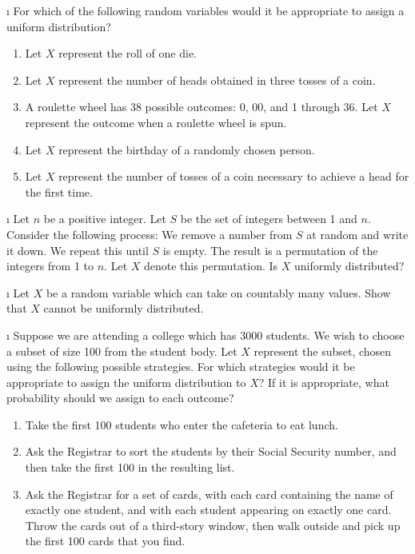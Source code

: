 \begin{LJSItem}

\i\label{exer 5.1.100} For which of the following random variables would it be
appropriate to assign a uniform distribution?
\begin{enumerate}
\item Let $X$ represent the roll of one die.
\item Let $X$ represent the number of heads obtained in three tosses of a coin.
\item A roulette wheel has 38 possible outcomes: 0, 00, and 1 through 36.  Let $X$
represent the outcome when a roulette wheel is spun.
\item Let $X$ represent the birthday of a randomly chosen person.
\item Let $X$ represent the number of tosses of a coin necessary to achieve a head for
the first time. 
\end{enumerate}

\i\label{exer 5.1.101} Let $n$ be a positive integer.  Let $S$ be the set of
integers between 1 and
$n$. Consider the following process:   We remove a number from $S$ at random and write it down. 
We repeat this until $S$ is empty.  The result is a permutation of the integers from 1
to $n$.  Let $X$ denote this permutation.  Is $X$ uniformly distributed?

\i\label{exer 5.1.102} Let $X$ be a random variable which can take on countably
many values.  Show that
$X$ cannot be uniformly distributed.

\i\label{exer 5.1.103} Suppose we are attending a college which has 3000 students. 
We wish to choose a subset of size 100 from the student body.  Let $X$ represent the
subset, chosen using the following possible strategies.  For which strategies would it
be appropriate to assign the uniform distribution to $X$?  If it is appropriate, what
probability should we assign to each outcome?
\begin{enumerate}
\item Take the first 100 students who enter the cafeteria to eat lunch.
\item Ask the Registrar to sort the students by their Social Security number, and then
take the first 100 in the resulting list.
\item Ask the Registrar for a set of cards, with each card containing the name of
exactly one student, and with each student appearing on exactly one card.  Throw the
cards out of a third-story window, then walk outside and pick up the first 100 cards
that you find.
\end{enumerate}


\end{LJSItem}
